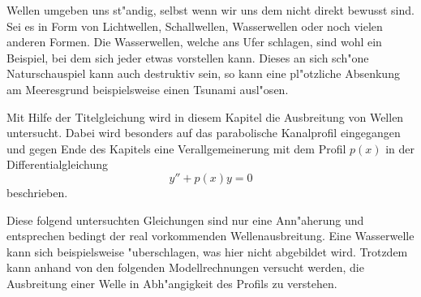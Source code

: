Wellen umgeben uns st"andig, selbst wenn wir uns dem nicht direkt bewusst sind. 
Sei es in Form von Lichtwellen, Schallwellen, Wasserwellen oder noch vielen 
anderen Formen. Die Wasserwellen, welche ans Ufer schlagen, sind wohl ein 
Beispiel, bei dem sich jeder etwas vorstellen kann. Dieses an sich sch"one 
Naturschauspiel kann auch destruktiv sein, so kann eine pl"otzliche Absenkung 
am Meeresgrund beispielsweise einen Tsunami ausl"osen.

Mit Hilfe der Titelgleichung wird in diesem Kapitel die Ausbreitung von Wellen 
untersucht. Dabei wird besonders auf das parabolische Kanalprofil eingegangen 
und gegen Ende des Kapitels eine Verallgemeinerung mit dem Profil $p(x)$ in der 
Differentialgleichung
\begin{equation}
	y'' + p(x) y = 0
	\label{eq:wellen:pxdgl}
\end{equation}
beschrieben.

Diese folgend untersuchten Gleichungen sind nur eine Ann"aherung und 
entsprechen bedingt der real vorkommenden Wellenausbreitung. Eine Wasserwelle 
kann sich beispielsweise "uberschlagen, was hier nicht abgebildet wird. 
Trotzdem kann anhand von den folgenden Modellrechnungen versucht werden, die 
Ausbreitung einer Welle in Abh"angigkeit des Profils zu verstehen.
